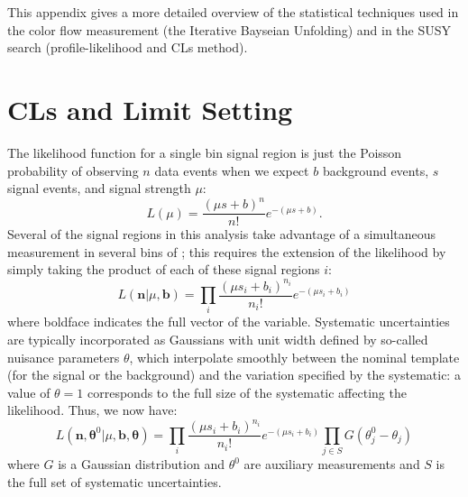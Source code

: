 \label{appendix:statistics}

This appendix gives a more detailed overview of the statistical techniques used in the color flow measurement (the Iterative Bayseian Unfolding) and in the SUSY search (profile-likelihood and CLs method).

\section{CLs and Limit Setting}


The likelihood function for a single bin signal region is just the Poisson probability of observing $n$ data events when we expect $b$ background events, $s$ signal events, and signal strength $\mu$:
%
\begin{equation}
L(\mu) = \frac{(\mu s + b)^n}{n!} e^{-(\mu s + b)}.
\end{equation}
%
Several of the signal regions in this analysis take advantage of a simultaneous measurement in several bins of \MJ; this requires the extension of the likelihood by simply taking the product of each of these signal regions $i$:
%
\begin{equation}
L(\boldsymbol{n}|\mu,\boldsymbol{b}) = \prod_i \frac{(\mu s_i + b_i)^{n_i}}{n_i!} e^{-(\mu s_i + b_i)}
\end{equation}
%
where boldface indicates the full vector of the variable. Systematic uncertainties are typically incorporated as Gaussians with unit width defined by so-called nuisance parameters $\theta$, which interpolate smoothly between the nominal template (for the signal or the background) and the variation specified by the systematic: a value of $\theta = 1$ corresponds to the full size of the systematic affecting the likelihood. Thus, we now have:
%
\begin{equation}
L(\boldsymbol{n}, \boldsymbol{\theta}^0 |\mu,\boldsymbol{b},\boldsymbol{\theta}) = \prod_i \frac{(\mu s_i + b_i)^{n_i}}{n_i!} e^{-(\mu s_i + b_i)} \prod_{j \in S} G(\theta^0_j - \theta_j )
\end{equation}
%
where $G$ is a Gaussian distribution and $\theta^0$ are auxiliary measurements and $S$ is the full set of systematic uncertainties.


